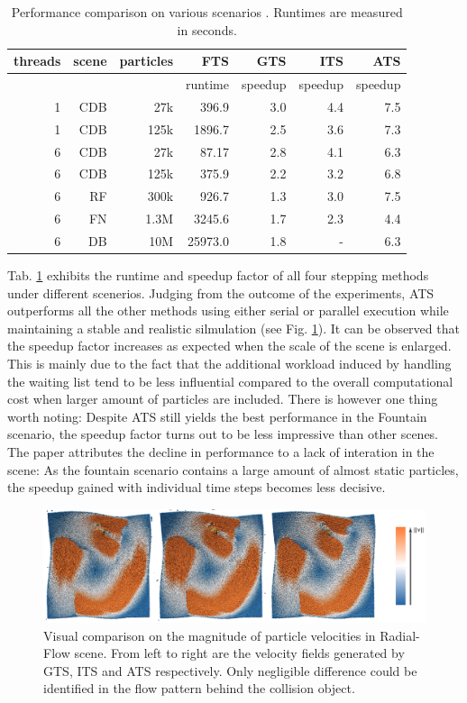 \documentclass[
	11pt, 
	DIV10,
	ngerman,
	a4paper, 
	oneside, 
	headings=normal, 
	captions=tableheading,
	final, 
	numbers=noenddot
]{scrartcl}
\begin{document}
\begin{table}[tb]
	\centering
	\begin{tabular}{|r|r|r|r|r|r|r|}
		\hline
		threads & scene & particles & FTS & GTS & ITS & ATS \\
		\hline
		& & & runtime & speedup & speedup & speedup \\
		\hline	
		1 & CDB & 27k & 396.9 & 3.0 & 4.4 & 7.5 \\
		1 & CDB & 125k & 1896.7 & 2.5 & 3.6 & 7.3 \\
		6 & CDB & 27k & 87.17 & 2.8 & 4.1 & 6.3 \\
		6 & CDB & 125k & 375.9 & 2.2 & 3.2 & 6.8 \\
		6 & RF & 300k & 926.7 & 1.3 & 3.0 & 7.5 \\
		6 & FN & 1.3M & 3245.6 & 1.7 & 2.3 & 4.4 \\
		6 & DB & 10M & 25973.0 & 1.8 & - & 6.3 \\
		\hline
	\end{tabular}
	\caption{\label{tab1} Performance comparison on various scenarios \cite{reinhardt2017fully}. Runtimes are measured in seconds.}
\end{table}

Tab. \ref{tab1} exhibits the runtime and speedup factor of all four stepping methods under different scenerios. Judging from the outcome of the experiments, ATS outperforms all the other methods using either serial or parallel execution while maintaining a stable and realistic silmulation (see Fig. \ref{fig7}). It can be observed that the speedup factor increases as expected when the scale of the scene is enlarged. This is mainly due to the fact that the additional workload induced by handling the waiting list tend to be less influential compared to the overall computational cost when larger amount of particles are included. There is however one thing worth noting: Despite ATS still yields the best performance in the Fountain scenario, the speedup factor turns out to be less impressive than other scenes. The paper attributes the decline in performance to a lack of interation in the scene: As the fountain scenario contains a large amount of almost static particles, the speedup gained with individual time steps becomes less decisive.

\begin{figure}[tb]
	\centering
	\includegraphics[scale=0.26]{images/2}
	\caption{\label{fig7} Visual comparison on the magnitude of particle velocities in Radial-Flow scene\cite{reinhardt2017fully}. From left to right are the velocity fields generated by GTS, ITS and ATS respectively. Only negligible difference could be identified in the flow pattern behind the collision object.}
\end{figure}
\end{document}
